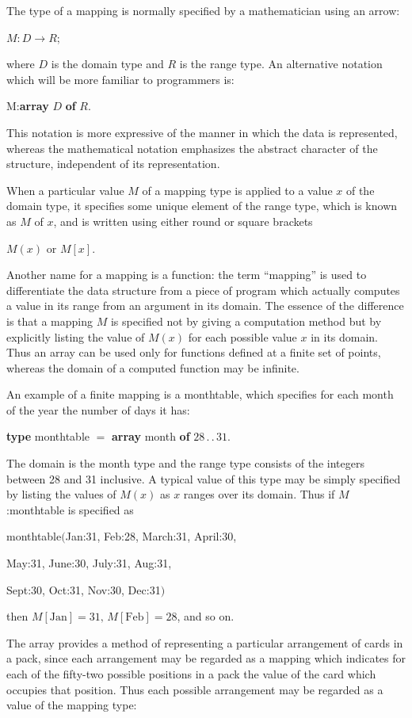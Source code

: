 The type of a mapping is normally specified by a mathematician using an arrow:

\quad $M:D\rightarrow R$;

\noindent
where $D$ is the domain type and $R$ is the range type. An alternative notation which will be more familiar to programmers is:

\quad M:\textbf{array} $D$ \textbf{of} $R$.

This notation is more expressive of the manner in which the data is represented, whereas the mathematical notation emphasizes the abstract character of the structure, independent of its representation.

When a particular value $M$ of a mapping type is applied to a value $x$ of the domain type, it specifies some unique element of the range type, which is known as $M$ of $x$, and is written using either round or square brackets

\quad $M(x)$ or $M[x]$.

\noindent
Another name for a mapping is a function: the term ``mapping'' is used to differentiate the data structure from a piece of program which actually computes a value in its range from an argument in its domain. The essence of the difference is that a mapping $M$ is specified not by giving a computation method but by explicitly listing the value of $M(x)$ for each possible value $x$ in its domain. Thus an array can be used only for functions defined at a finite set of points, whereas the domain of a computed function may be infinite.

An example of a finite mapping is a monthtable, which specifies for each month of the year the number of days it has:

\quad \textbf{type} monthtable $=$ \textbf{array} month \textbf{of} $28\,.\,.\,31$.

\noindent
The domain is the month type and the range type consists of the integers between 28 and 31 inclusive. A typical value of this type may be simply specified by listing the values of $M(x)$ as $x$ ranges over its domain. Thus if $M$:monthtable is specified as

\quad monthtable$($Jan:31, Feb:28, March:31, April:30,

\quad May:31, June:30, July:31, Aug:31,

\quad Sept:30, Oct:31, Nov:30, Dec:31$)$

\noindent
then $M[\text{Jan}] = 31,\, M[\text{Feb}] = 28$, and so on.

The array provides a method of representing a particular arrangement of cards in a pack, since each arrangement may be regarded as a mapping which indicates for each of the fifty-two possible positions in a pack the value of the card which occupies that position. Thus each possible arrangement may be regarded as a value of the mapping type:

